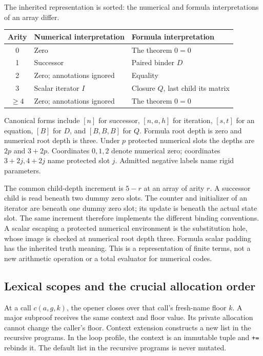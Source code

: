 \documentclass[11pt]{article}
\theoremstyle{definition}\newtheorem{definition}[theorem]{Definition}
\begin{document}
The inherited representation is sorted: the numerical and formula
interpretations of an array differ.
\begin{center}\small
\begin{tabularx}{\linewidth}{@{}cXX@{}}
\toprule
Arity & Numerical interpretation & Formula interpretation\\\midrule
0 & Zero & The theorem $0=0$\\
1 & Successor & Paired binder $D$\\
2 & Zero; annotations ignored & Equality\\
3 & Scalar iterator $I$ & Closure $Q$, last child its matrix\\
$\ge4$ & Zero; annotations ignored & The theorem $0=0$\\
\bottomrule
\end{tabularx}
\end{center}
Canonical forms include $[n]$ for successor, $[n,a,h]$ for iteration,
$[s,t]$ for an equation, $[B]$ for $D$, and $[B,B,B]$ for $Q$.
Formula root depth is zero and numerical root depth is three. Under
$p$ protected numerical slots the depths are $2p$ and $3+2p$.
Coordinates $0,1,2$ denote numerical zero; coordinates $3+2j,4+2j$
name protected slot $j$. Admitted negative labels name rigid parameters.

The common child-depth increment is $5-r$ at an array of arity $r$.
A successor child is read beneath two dummy zero slots. The counter
and initializer of an iterator are beneath one dummy zero slot; its
update is beneath the actual state slot. The same increment therefore
implements the different binding conventions. A scalar escaping a
protected numerical environment is the substitution hole, whose image
is checked at numerical root depth three. Formula scalar padding has
the inherited truth meaning. This is a representation of finite terms,
not a new arithmetic operation or a total evaluator for numerical codes.

\subsection{Lexical scopes and the crucial allocation order}
At a call $c(a,g,k)$, the opener closes over that call's fresh-name floor
$k$. A major subproof receives the same context and floor value. Its
private allocation cannot change the caller's floor. Context extension
constructs a new list in the recursive programs. In the loop profile,
the context is an immutable tuple and \texttt{+=} rebinds it. The default
list in the recursive programs is never mutated.
\end{document}
